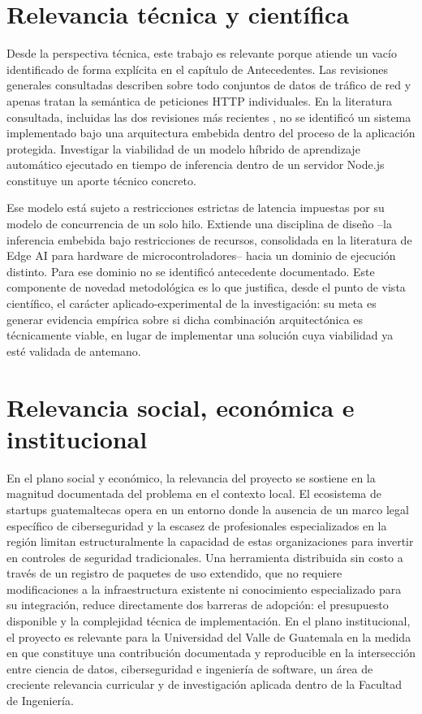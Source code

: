 \section{Relevancia técnica y científica}

Desde la perspectiva técnica, este trabajo es relevante porque atiende un vacío identificado de forma explícita en el capítulo de Antecedentes. Las revisiones generales consultadas describen sobre todo conjuntos de datos de tráfico de red y apenas tratan la semántica de peticiones HTTP individuales. En la literatura consultada, incluidas las dos revisiones más recientes \textcite{zhen2025,rahman2026}, no se identificó un sistema implementado bajo una arquitectura embebida dentro del proceso de la aplicación protegida. Investigar la viabilidad de un modelo híbrido de aprendizaje automático ejecutado en tiempo de inferencia dentro de un servidor Node.js constituye un aporte técnico concreto.

Ese modelo está sujeto a restricciones estrictas de latencia impuestas por su modelo de concurrencia de un solo hilo. Extiende una disciplina de diseño --la inferencia embebida bajo restricciones de recursos, consolidada en la literatura de Edge AI para hardware de microcontroladores-- hacia un dominio de ejecución distinto. Para ese dominio no se identificó antecedente documentado. Este componente de novedad metodológica es lo que justifica, desde el punto de vista científico, el carácter aplicado-experimental de la investigación: su meta es generar evidencia empírica sobre si dicha combinación arquitectónica es técnicamente viable, en lugar de implementar una solución cuya viabilidad ya esté validada de antemano.

\section{Relevancia social, económica e institucional}

En el plano social y económico, la relevancia del proyecto se sostiene en la magnitud documentada del problema en el contexto local. El ecosistema de startups guatemaltecas opera en un entorno donde la ausencia de un marco legal específico de ciberseguridad y la escasez de profesionales especializados en la región limitan estructuralmente la capacidad de estas organizaciones para invertir en controles de seguridad tradicionales. Una herramienta distribuida sin costo a través de un registro de paquetes de uso extendido, que no requiere modificaciones a la infraestructura existente ni conocimiento especializado para su integración, reduce directamente dos barreras de adopción: el presupuesto disponible y la complejidad técnica de implementación. En el plano institucional, el proyecto es relevante para la Universidad del Valle de Guatemala en la medida en que constituye una contribución documentada y reproducible en la intersección entre ciencia de datos, ciberseguridad e ingeniería de software, un área de creciente relevancia curricular y de investigación aplicada dentro de la Facultad de Ingeniería.

